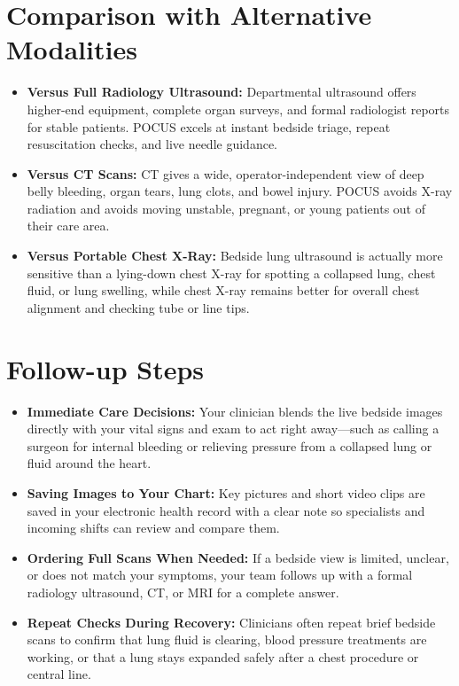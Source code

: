 \section{Comparison with Alternative Modalities}

\begin{itemize}
    \item \textbf{Versus Full Radiology Ultrasound:} Departmental ultrasound offers higher-end equipment, complete organ surveys, and formal radiologist reports for stable patients. POCUS excels at instant bedside triage, repeat resuscitation checks, and live needle guidance.
    \item \textbf{Versus CT Scans:} CT gives a wide, operator-independent view of deep belly bleeding, organ tears, lung clots, and bowel injury. POCUS avoids X-ray radiation and avoids moving unstable, pregnant, or young patients out of their care area.
    \item \textbf{Versus Portable Chest X-Ray:} Bedside lung ultrasound is actually more sensitive than a lying-down chest X-ray for spotting a collapsed lung, chest fluid, or lung swelling, while chest X-ray remains better for overall chest alignment and checking tube or line tips.
\end{itemize}

\section{Follow-up Steps}

\begin{itemize}
    \item \textbf{Immediate Care Decisions:} Your clinician blends the live bedside images directly with your vital signs and exam to act right away---such as calling a surgeon for internal bleeding or relieving pressure from a collapsed lung or fluid around the heart.
    \item \textbf{Saving Images to Your Chart:} Key pictures and short video clips are saved in your electronic health record with a clear note so specialists and incoming shifts can review and compare them.
    \item \textbf{Ordering Full Scans When Needed:} If a bedside view is limited, unclear, or does not match your symptoms, your team follows up with a formal radiology ultrasound, CT, or MRI for a complete answer.
    \item \textbf{Repeat Checks During Recovery:} Clinicians often repeat brief bedside scans to confirm that lung fluid is clearing, blood pressure treatments are working, or that a lung stays expanded safely after a chest procedure or central line.
\end{itemize}

